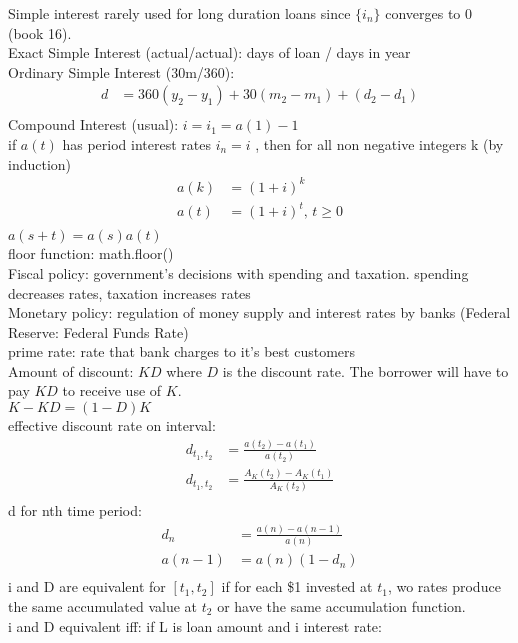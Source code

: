 \documentclass[12pt]{article}
\begin{document}
	Simple interest rarely used for long duration loans since $ \{i_n\} $ converges
	to 0 (book 16). \\
	Exact Simple Interest (actual/actual): days of loan / days in year \\
	Ordinary Simple Interest (30m/360):
	\begin{align*}
		d &= 360(y_2-y_1) + 30(m_2 - m_1) + (d_2 - d_1) \\
	\end{align*}
	Compound Interest (usual): $ i = i_1 = a(1) - 1 $ \\
	if $ a(t) $ has period interest rates $ i_n = i $ , then for all 
	non negative integers k (by induction)
	\begin{align*}
		a(k) &=  (1 + i)^k \\
		a(t) &= (1 + i)^t \text{, } t \ge 0 \\
	\end{align*}
	$ a(s + t) = a(s)a(t) $ \\
	floor function: math.floor() \\
	Fiscal policy: government's decisions with spending and taxation. 
	spending decreases rates, taxation increases rates \\
	Monetary policy: regulation of money supply and interest rates by banks 
	(Federal Reserve: Federal Funds Rate) \\
	prime rate: rate that bank charges to it's best customers \\
	Amount of discount: $ KD $ where $ D $ is the discount rate.
	The borrower will have to pay $ KD $ to receive use of $ K $. \\
	$ K - KD = (1-D)K $\\
	effective discount rate on interval:
	\begin{align*}
		d_{{t_1, t_2}} &= \frac{a(t_2) - a(t_1)}{a(t_2)}  \\
		d_{{t_1, t_2}} &= \frac{A_K(t_2) - A_K(t_1)}{A_K(t_2)} \\
	\end{align*}
	d for nth time period:
	\begin{align*}
		d_n &= \frac{a(n) - a(n-1)}{a(n)}  \\
		a(n-1) &= a(n)(1-d_n) \\
	\end{align*}	
	i and D are equivalent for $ [t_1, t_2] $ if for each \$1 invested
	at $ t_1 $, wo rates produce the same accumulated value at $ t_2 $ or have
	the same accumulation function. \\
	i and D equivalent iff: if L is loan amount and i interest rate:
\end{document}
